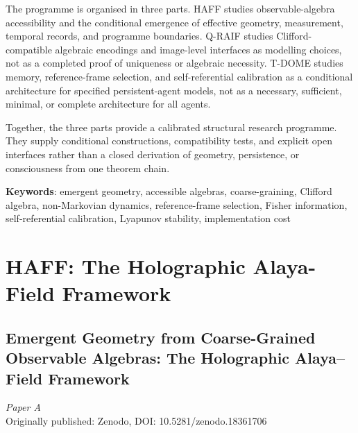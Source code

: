\documentclass[12pt,a4paper,openany]{book}
\begin{document}
The programme is organised in three parts.  HAFF studies observable-algebra accessibility and the conditional emergence of effective geometry, measurement, temporal records, and programme boundaries.  Q-RAIF studies Clifford-compatible algebraic encodings and image-level interfaces as modelling choices, not as a completed proof of uniqueness or algebraic necessity.  T-DOME studies memory, reference-frame selection, and self-referential calibration as a conditional architecture for specified persistent-agent models, not as a necessary, sufficient, minimal, or complete architecture for all agents.

Together, the three parts provide a calibrated structural research programme.  They supply conditional constructions, compatibility tests, and explicit open interfaces rather than a closed derivation of geometry, persistence, or consciousness from one theorem chain.

\bigskip
\noindent\textbf{Keywords}: emergent geometry, accessible algebras, coarse-graining, Clifford algebra, non-Markovian dynamics, reference-frame selection, Fisher information, self-referential calibration, Lyapunov stability, implementation cost

\tableofcontents

\mainmatter

\part{HAFF: The Holographic Alaya-Field Framework}
\label{part:HAFF}

\chapter{Emergent Geometry from Coarse-Grained Observable Algebras: The Holographic Alaya--Field Framework}
\label{H-chap:paperA}

\begin{center}
\textit{Paper A}\\[0.5em]
Originally published: Zenodo, DOI: 10.5281/zenodo.18361706
\end{center}

\bigskip
\end{document}

